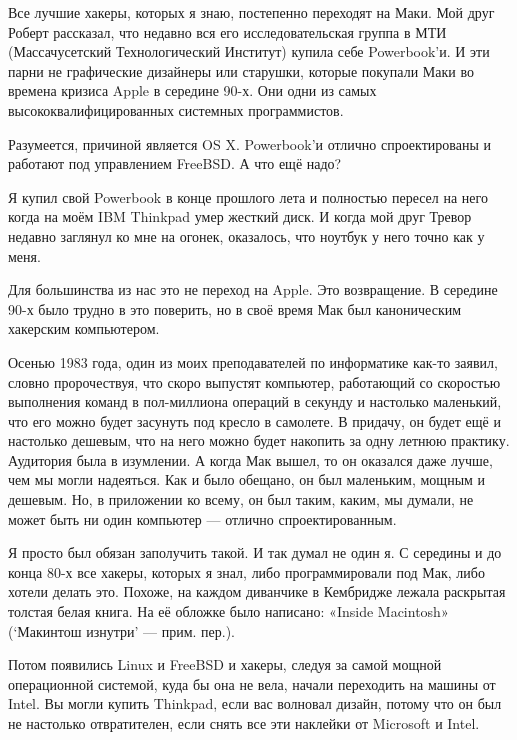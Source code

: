 \documentclass[ebook,12pt,oneside,openany]{memoir}
\date{}
\begin{document}
\maketitle

Все лучшие хакеры, которых я знаю, постепенно переходят на Маки. Мой
друг Роберт рассказал, что недавно вся его исследовательская группа в
МТИ (Массачусетский Технологический Институт) купила себе Powerbook’и.
И эти парни не графические дизайнеры или старушки, которые покупали
Маки во времена кризиса Apple в середине 90-х. Они одни из самых
высококвалифицированных системных программистов.

Разумеется, причиной является OS X. Powerbook’и отлично спроектированы
и работают под управлением FreeBSD. А что ещё надо?

Я купил свой Powerbook в конце прошлого лета и полностью пересел на
него когда на моём IBM Thinkpad умер жесткий диск. И когда мой друг
Тревор недавно заглянул ко мне на огонек, оказалось, что ноутбук у
него точно как у меня.

Для большинства из нас это не переход на Apple. Это возвращение. В
середине 90-х было трудно в это поверить, но в своё время Мак был
каноническим хакерским компьютером.

Осенью 1983 года, один из моих преподавателей по информатике как-то
заявил, словно пророчествуя, что скоро выпустят компьютер, работающий
со скоростью выполнения команд в пол-миллиона операций в секунду и
настолько маленький, что его можно будет засунуть под кресло в
самолете. В придачу, он будет ещё и настолько дешевым, что на него
можно будет накопить за одну летнюю практику. Аудитория была в
изумлении. А когда Мак вышел, то он оказался даже лучше, чем мы могли
надеяться. Как и было обещано, он был маленьким, мощным и дешевым. Но,
в приложении ко всему, он был таким, каким, мы думали, не может быть
ни один компьютер — отлично спроектированным.

Я просто был обязан заполучить такой. И так думал не один я. С
середины и до конца 80-х все хакеры, которых я знал, либо
программировали под Мак, либо хотели делать это. Похоже, на каждом
диванчике в Кембридже лежала раскрытая толстая белая книга. На её
обложке было написано: «Inside Macintosh» (‘Макинтош изнутри’ — прим.
пер.).

Потом появились Linux и FreeBSD и хакеры, следуя за самой мощной
операционной системой, куда бы она не вела, начали переходить на
машины от Intel. Вы могли купить Thinkpad, если вас волновал дизайн,
потому что он был не настолько отвратителен, если снять все эти
наклейки от Microsoft и Intel.
\end{document}
